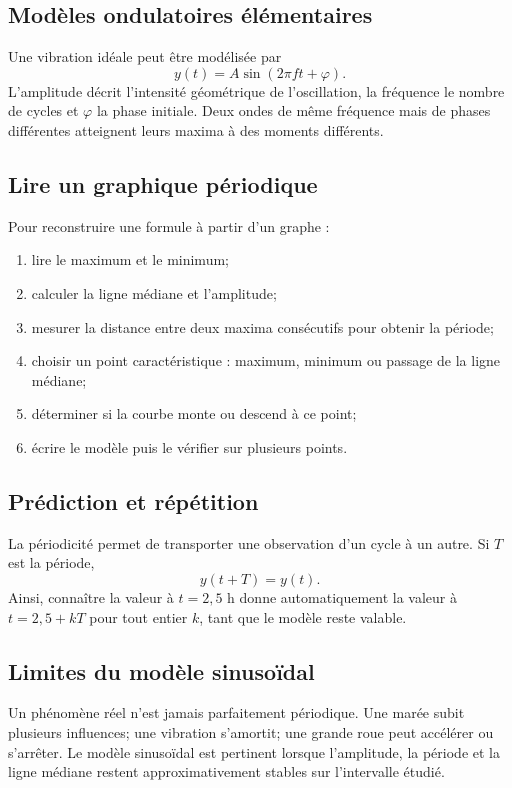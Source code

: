 \documentclass[12pt,a4paper,openany]{book}
\begin{document}
\subsection{Modèles ondulatoires élémentaires}

Une vibration idéale peut être modélisée par
\[
y(t)=A\sin(2\pi ft+\varphi).
\]
L'amplitude décrit l'intensité géométrique de l'oscillation, la fréquence le nombre de cycles et $\varphi$ la phase initiale. Deux ondes de même fréquence mais de phases différentes atteignent leurs maxima à des moments différents.

\subsection{Lire un graphique périodique}

Pour reconstruire une formule à partir d'un graphe :
\begin{enumerate}
\item lire le maximum et le minimum;
\item calculer la ligne médiane et l'amplitude;
\item mesurer la distance entre deux maxima consécutifs pour obtenir la période;
\item choisir un point caractéristique : maximum, minimum ou passage de la ligne médiane;
\item déterminer si la courbe monte ou descend à ce point;
\item écrire le modèle puis le vérifier sur plusieurs points.
\end{enumerate}

\subsection{Prédiction et répétition}

La périodicité permet de transporter une observation d'un cycle à un autre. Si $T$ est la période,
\[
y(t+T)=y(t).
\]
Ainsi, connaître la valeur à $t=2{,}5$ h donne automatiquement la valeur à $t=2{,}5+kT$ pour tout entier $k$, tant que le modèle reste valable.

\subsection{Limites du modèle sinusoïdal}

Un phénomène réel n'est jamais parfaitement périodique. Une marée subit plusieurs influences; une vibration s'amortit; une grande roue peut accélérer ou s'arrêter. Le modèle sinusoïdal est pertinent lorsque l'amplitude, la période et la ligne médiane restent approximativement stables sur l'intervalle étudié.
\end{document}
